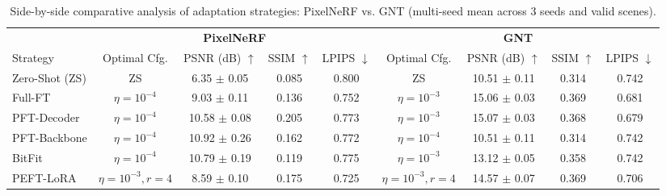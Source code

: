 \begin{table}[t]
\centering
\caption{Side-by-side comparative analysis of adaptation strategies: PixelNeRF vs. GNT (multi-seed mean across 3 seeds and valid scenes).}
\label{tab:mixed_side_by_side}
\small
\begin{tabular*}{\linewidth}{@{\extracolsep{\fill}}l|cccc|cccc@{\extracolsep{0pt}}}
\toprule
 & \multicolumn{4}{c|}{\textbf{PixelNeRF}} & \multicolumn{4}{c}{\textbf{GNT}} \\
\cmidrule{2-5} \cmidrule{6-9}
Strategy & Optimal Cfg. & PSNR (dB) $\uparrow$ & SSIM $\uparrow$ & LPIPS $\downarrow$ & Optimal Cfg. & PSNR (dB) $\uparrow$ & SSIM $\uparrow$ & LPIPS $\downarrow$ \\
\midrule
Zero-Shot (ZS)   & ZS                 & 6.35 $\pm$ 0.05        & 0.085  & 0.800  & ZS                 & 10.51 $\pm$ 0.11       & 0.314  & 0.742  \\
Full-FT          & $\eta=10^{-4}$     & 9.03 $\pm$ 0.11        & 0.136  & 0.752  & $\eta=10^{-3}$     & 15.06 $\pm$ 0.03       & 0.369  & 0.681  \\
PFT-Decoder      & $\eta=10^{-4}$     & 10.58 $\pm$ 0.08       & 0.205  & 0.773  & $\eta=10^{-3}$     & 15.07 $\pm$ 0.03       & 0.368  & 0.679  \\
PFT-Backbone     & $\eta=10^{-4}$     & 10.92 $\pm$ 0.26       & 0.162  & 0.772  & $\eta=10^{-4}$     & 10.51 $\pm$ 0.11       & 0.314  & 0.742  \\
BitFit           & $\eta=10^{-4}$     & 10.79 $\pm$ 0.19       & 0.119  & 0.775  & $\eta=10^{-3}$     & 13.12 $\pm$ 0.05       & 0.358  & 0.742  \\
PEFT-LoRA        & $\eta=10^{-3}, r=4$ & 8.59 $\pm$ 0.10        & 0.175  & 0.725  & $\eta=10^{-3}, r=4$ & 14.57 $\pm$ 0.07       & 0.369  & 0.706  \\
\bottomrule
\end{tabular*}
\end{table}
